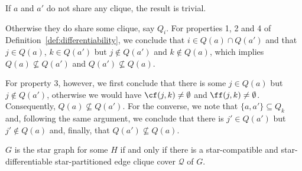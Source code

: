 \begin{tproof}
    If $a$ and $a'$ do not share any clique, the result is trivial.
    
    Otherwise they do share some clique, say $Q_i$.
    For properties 1, 2 and 4 of Definition~\ref{def:differentiability}, we conclude that $i \in Q(a) \cap Q(a')$ and that $j \in Q(a)$, $k \in Q(a')$ but $j \notin Q(a')$ and $k \notin Q(a)$, which implies $Q(a) \nsubseteq Q(a')$ and $Q(a') \nsubseteq Q(a)$.
    
    For property 3, however, we first conclude that there is some $j \in Q(a)$ but $j \notin Q(a')$, otherwise we would have $\cf(j,k) \neq \emptyset$ and $\ff(j,k) \neq \emptyset$.
    Consequently, $Q(a) \nsubseteq Q(a')$.
    For the converse, we note that $\{a, a'\} \subseteq Q_k$ and, following the same argument, we conclude that there is $j' \in Q(a')$ but $j' \notin Q(a)$ and, finally, that $Q(a') \nsubseteq Q(a)$.
\end{tproof}

\begin{theorem}
    \label{thm:star_characterization}
    $G$ is the star graph for some $H$ if and only if there is a star-compatible and star-differentiable star-partitioned edge clique cover $\mathcal{Q}$ of $G$.
\end{theorem}

